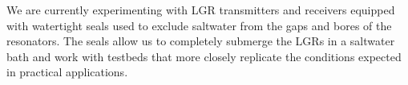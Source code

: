 \documentclass[conference]{IEEEtran}
\begin{document}
We are currently experimenting with LGR transmitters and receivers equipped with watertight seals used to exclude saltwater from the gaps and bores of the resonators.  The seals allow us to completely submerge the LGRs in a saltwater bath and work with testbeds that more closely replicate the conditions expected in practical applications.





\begin{comment}
\section*{References}

Please number citations consecutively within brackets \cite{b1}. The 
sentence punctuation follows the bracket \cite{b2}. Refer simply to the reference 
number, as in \cite{b3}---do not use ``Ref. \cite{b3}'' or ``reference \cite{b3}'' except at 
the beginning of a sentence: ``Reference \cite{b3} was the first $\ldots$''

Number footnotes separately in superscripts. Place the actual footnote at 
the bottom of the column in which it was cited. Do not put footnotes in the 
abstract or reference list. Use letters for table footnotes.

Unless there are six authors or more give all authors' names; do not use 
``et al.''. Papers that have not been published, even if they have been 
submitted for publication, should be cited as ``unpublished'' \cite{b4}. Papers 
that have been accepted for publication should be cited as ``in press'' \cite{b5}. 
Capitalize only the first word in a paper title, except for proper nouns and 
element symbols.

For papers published in translation journals, please give the English 
citation first, followed by the original foreign-language citation \cite{b6}.
\end{comment}
\end{document}
